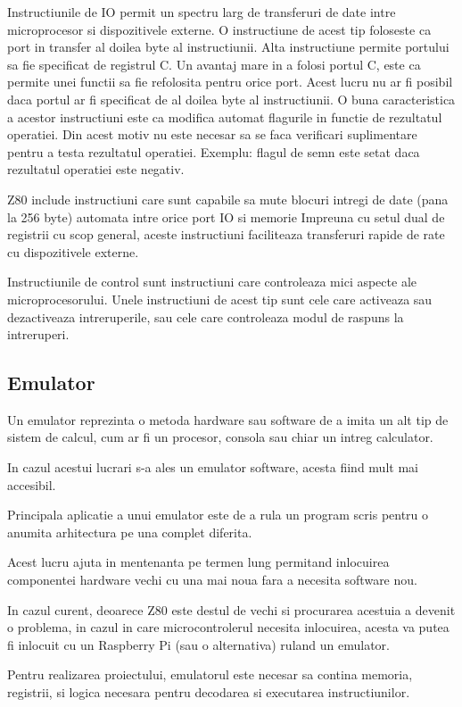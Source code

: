 \documentclass[titlepage,12pt]{article}
\begin{document}
Instructiunile de \ac {IO} permit un spectru larg de transferuri de date intre microprocesor si dispozitivele externe.
O instructiune de acest tip foloseste ca port in transfer al doilea byte al instructiunii.
Alta instructiune permite portului sa fie specificat de registrul C.
Un avantaj mare in a folosi portul C, este ca permite unei functii sa fie refolosita pentru orice port.
Acest lucru nu ar fi posibil daca portul ar fi specificat de al doilea byte al instructiunii.
O buna caracteristica a acestor instructiuni este ca modifica automat flagurile in functie de rezultatul operatiei.
Din acest motiv nu este necesar sa se faca verificari suplimentare pentru a testa rezultatul operatiei. Exemplu: flagul de semn este setat daca rezultatul operatiei este negativ.

\ac {Z80} include instructiuni care sunt capabile sa mute blocuri intregi de date (pana la 256 byte) automata intre orice port \ac {IO} si memorie
Impreuna cu setul dual de registrii cu scop general, aceste instructiuni faciliteaza transferuri rapide de rate cu dispozitivele externe.

Instructiunile de control sunt instructiuni care controleaza mici aspecte ale microprocesorului.
Unele instructiuni de acest tip sunt cele care activeaza sau dezactiveaza intreruperile, sau cele care controleaza modul de raspuns la intreruperi.

\subsection{Emulator}
Un emulator reprezinta o metoda hardware sau software de a imita un alt tip de sistem de calcul, cum ar fi un procesor, consola sau chiar un intreg calculator.

In cazul acestui lucrari s-a ales un emulator software, acesta fiind mult mai accesibil.

Principala aplicatie a unui emulator este de a rula un program scris pentru o anumita arhitectura pe una complet diferita.

Acest lucru ajuta in mentenanta pe termen lung permitand inlocuirea componentei hardware vechi cu una mai noua fara a necesita software nou.

In cazul curent, deoarece \ac {Z80} este destul de vechi si procurarea acestuia a devenit o problema, in cazul in care microcontrolerul necesita inlocuirea, acesta va putea fi inlocuit cu un Raspberry Pi (sau o alternativa) ruland un emulator.

Pentru realizarea proiectului, emulatorul este necesar sa contina memoria, registrii, si logica necesara pentru decodarea si executarea instructiunilor.
\end{document}
